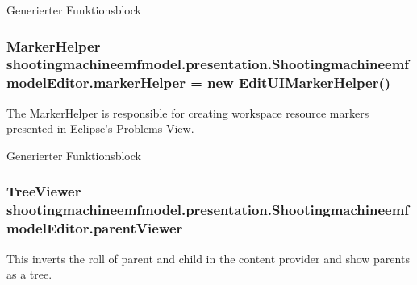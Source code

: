 Generierter Funktionsblock \hypertarget{classshootingmachineemfmodel_1_1presentation_1_1_shootingmachineemfmodel_editor_a8fca1a50d4e1743045a3d72583e7e059}{
\subsubsection[{marker\-Helper}]{\setlength{\rightskip}{0pt plus 5cm}Marker\-Helper shootingmachineemfmodel.\-presentation.\-Shootingmachineemfmodel\-Editor.\-marker\-Helper = new Edit\-U\-I\-Marker\-Helper()\hspace{0.3cm}{\ttfamily [protected]}}}\label{classshootingmachineemfmodel_1_1presentation_1_1_shootingmachineemfmodel_editor_a8fca1a50d4e1743045a3d72583e7e059}
The Marker\-Helper is responsible for creating workspace resource markers presented in Eclipse's Problems View.

Generierter Funktionsblock \hypertarget{classshootingmachineemfmodel_1_1presentation_1_1_shootingmachineemfmodel_editor_a51e68ebf3e9ae230b2e144a9ad94c955}{
\subsubsection[{parent\-Viewer}]{\setlength{\rightskip}{0pt plus 5cm}Tree\-Viewer shootingmachineemfmodel.\-presentation.\-Shootingmachineemfmodel\-Editor.\-parent\-Viewer\hspace{0.3cm}{\ttfamily [protected]}}}\label{classshootingmachineemfmodel_1_1presentation_1_1_shootingmachineemfmodel_editor_a51e68ebf3e9ae230b2e144a9ad94c955}
This inverts the roll of parent and child in the content provider and show parents as a tree.


